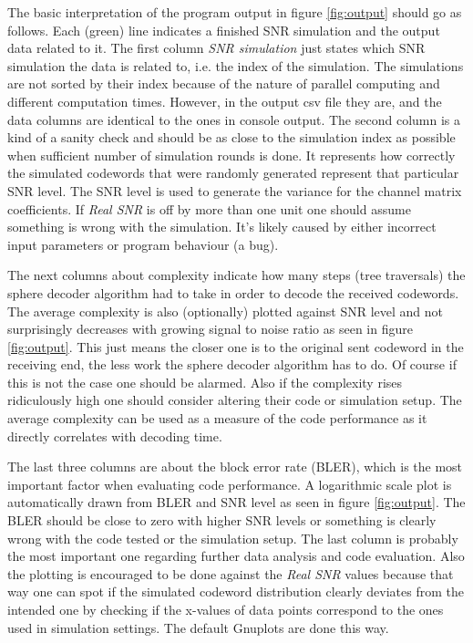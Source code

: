 \documentclass[english,12pt,a4paper,pdftex,sci,utf8]{aaltothesis}
\begin{document}
The basic interpretation of the program output in figure \ref{fig:output} should go as follows. Each (green) line indicates a finished SNR simulation and the output data related to it. The first column \emph{SNR simulation} just states which SNR simulation the data is related to, i.e. the index of the simulation. The simulations are not sorted by their index because of the nature of parallel computing and different computation times. However, in the output csv file they are, and the data columns are identical to the ones in console output. The second column is a kind of a sanity check and should be as close to the simulation index as possible when sufficient number of simulation rounds is done. It represents how correctly the simulated codewords that were randomly generated represent that particular SNR level. The SNR level is used to generate the variance for the channel matrix coefficients. If \emph{Real SNR} is off by more than one unit one should assume something is wrong with the simulation. It's likely caused by either incorrect input parameters or program behaviour (a bug). 
\par The next columns about complexity indicate how many steps (tree traversals) the sphere decoder algorithm had to take in order to decode the received codewords. The average complexity is also (optionally) plotted against SNR level and not surprisingly decreases with growing signal to noise ratio as seen in figure \ref{fig:output}. This just means the closer one is to the original sent codeword in the receiving end, the less work the sphere decoder algorithm has to do. Of course if this is not the case one should be alarmed. Also if the complexity rises ridiculously high one should consider altering  their code or simulation setup. The average complexity can be used as a measure of the code performance as it directly correlates with decoding time.
\par The last three columns are about the block error rate (BLER), which is the most important factor when evaluating code performance. A logarithmic scale plot is automatically drawn from BLER and SNR level as seen in figure \ref{fig:output}. The BLER should be close to zero with higher SNR levels or something is clearly wrong with the code tested or the simulation setup. The last column is probably the most important one regarding further data analysis and code evaluation. Also the plotting is encouraged to be done against the \emph{Real SNR} values because that way one can spot if the simulated codeword distribution clearly deviates from the intended one by checking if the x-values of data points correspond to the ones used in simulation settings. The default Gnuplots are done this way.
\end{document}
